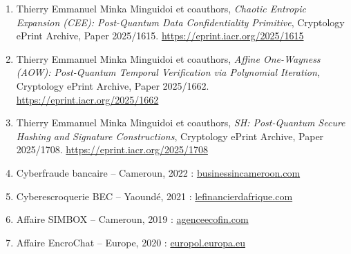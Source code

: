 \documentclass[11pt]{article}
\begin{document}
\begin{enumerate}
    \item Thierry Emmanuel Minka Minguidoi et coauthors, \textit{Chaotic Entropic Expansion (CEE): Post-Quantum Data Confidentiality Primitive}, Cryptology ePrint Archive, Paper 2025/1615. \href{https://eprint.iacr.org/2025/1615}{https://eprint.iacr.org/2025/1615}

    \item Thierry Emmanuel Minka Minguidoi et coauthors, \textit{Affine One-Wayness (AOW): Post-Quantum Temporal Verification via Polynomial Iteration}, Cryptology ePrint Archive, Paper 2025/1662. \href{https://eprint.iacr.org/2025/1662}{https://eprint.iacr.org/2025/1662}

    \item Thierry Emmanuel Minka Minguidoi et coauthors, \textit{SH: Post-Quantum Secure Hashing and Signature Constructions}, Cryptology ePrint Archive, Paper 2025/1708. \href{https://eprint.iacr.org/2025/1708}{https://eprint.iacr.org/2025/1708}

    \item Cyberfraude bancaire – Cameroun, 2022 : \href{https://www.businessincameroon.com/public-management/0703-12393-cameroon-lost-xaf12-2-bln-to-cybercrime-in-2021-antic?utm_source=chatgpt.com}{businessincameroon.com}
    
    \item Cyberescroquerie BEC – Yaoundé, 2021 : \href{https://lefinancierdafrique.com/15598/cybercriminalite-afriland-first-bank-denonce-lutilisation-de-son-label-pour-des-arnaques/?utm_source=chatgpt.com}{lefinancierdafrique.com}
    
    \item Affaire SIMBOX – Cameroun, 2019 : \href{https://www.agenceecofin.com/law/0509-32083-sim-box-fraud-fcfa-13-billion-in-losses-for-cameroon-telecom-operators-in-2015-already?utm_source=chatgpt.com}{agenceecofin.com}
    
    \item Affaire EncroChat – Europe, 2020 : \href{https://www.europol.europa.eu/media-press/newsroom/news/dismantling-encrypted-criminal-encrochat-communications-leads-to-over-6-500-arrests-and-close-to-eur-900-million-seized?utm_source=chatgpt.com}{europol.europa.eu}
\end{enumerate}
\end{document}
